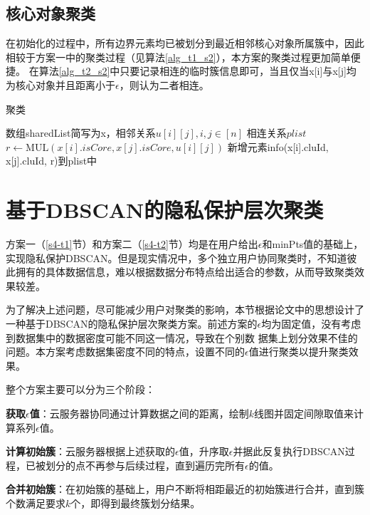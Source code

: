 \subsection{核心对象聚类}
在初始化的过程中，所有边界元素均已被划分到最近相邻核心对象所属簇中，因此相较于方案一中的聚类过程（见算法\ref{alg_t1_s2}），本方案的聚类过程更加简单便捷。
在算法\ref{alg_t2_s2}中只要记录相连的临时簇信息即可，当且仅当x[i]与x[j]均为核心对象并且距离小于$ \epsilon $，则认为二者相连。
\begin{algorithm}[htbp]
	\renewcommand{\algorithmicrequire}{\textbf{输入:}}
	\renewcommand{\algorithmicensure}{\textbf{输出:}}
	\caption{聚类}
	\label{alg_t2_s2}
	\begin{algorithmic}[1]
		\REQUIRE 数组sharedList简写为x，相邻关系$ u[i][j],i,j\in[n] $
		\ENSURE 相连关系$ plist $
		\STATE $ r \leftarrow \text{MUL}(x[i].isCore, x[j].isCore, u[i][j]) $
		\STATE 新增元素info(x[i].cluId, x[j].cluId, r)到plist中
		\ENDFOR
		\ENDFOR
	\end{algorithmic}
\end{algorithm}

\section{基于DBSCAN的隐私保护层次聚类}
\label{s4-t3}
方案一（\ref{s4-t1}节）和方案二（\ref{s4-t2}节）均是在用户给出$\epsilon$和minPts值的基础上，实现隐私保护DBSCAN。但是现实情况中，多个独立用户协同聚类时，不知道彼此拥有的具体数据信息，难以根据数据分布特点给出适合的参数，从而导致聚类效果较差。

为了解决上述问题，尽可能减少用户对聚类的影响，本节根据论文\cite{latifi2021dbhc}中的思想设计了一种基于DBSCAN的隐私保护层次聚类方案。前述方案的$\epsilon$均为固定值，没有考虑到数据集中的数据密度可能不同这一情况，导致在个别数 据集上划分效果不佳的问题。本方案考虑数据集密度不同的特点，设置不同的$\epsilon$值进行聚类以提升聚类效果。

整个方案主要可以分为三个阶段：
\begin{compactitem}
	\item \textbf{获取$\epsilon$值}：云服务器协同通过计算数据之间的距离，绘制$ k $线图并固定间隙取值来计算系列$\epsilon$值。
	\item \textbf{计算初始簇}：云服务器根据上述获取的$\epsilon$值，升序取$ \epsilon $并据此反复执行DBSCAN过程，已被划分的点不再参与后续过程，直到遍历完所有$\epsilon $的值。
	\item \textbf{合并初始簇}：在初始簇的基础上，用户不断将相距最近的初始簇进行合并，直到簇个数满足要求$ k $个，即得到最终簇划分结果。
\end{compactitem}

